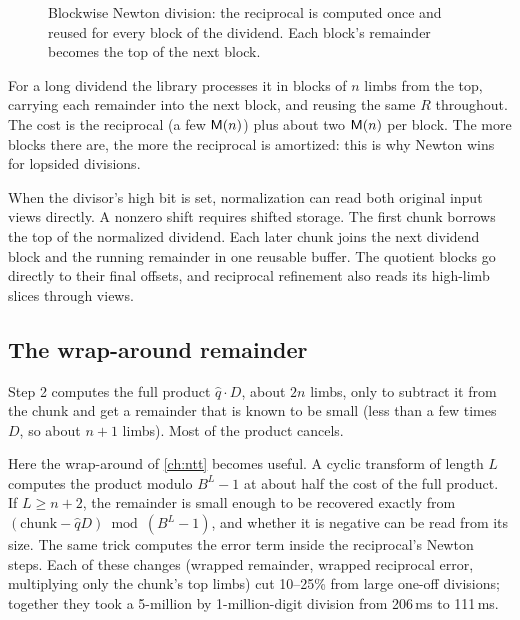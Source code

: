 \begin{figure}[ht]
\centering
{}
\caption{Blockwise Newton division: the reciprocal is computed once and reused for every
block of the dividend. Each block's remainder becomes the top of the next block.}
\end{figure}

For a long dividend the library processes it in blocks of $n$ limbs from the top, carrying
each remainder into the next block, and reusing the same $R$ throughout. The cost is the
reciprocal (a few $\mathsf{M}(n)$) plus about two $\mathsf{M}(n)$ per block. The more blocks there are, the
more the reciprocal is amortized: this is why Newton wins for lopsided divisions.

When the divisor's high bit is set, normalization can read both original input
views directly. A nonzero shift requires shifted storage. The first chunk borrows
the top of the normalized dividend. Each later chunk joins the next dividend
block and the running remainder in one reusable buffer. The quotient blocks go
directly to their final offsets, and reciprocal refinement also reads its
high-limb slices through views.

\subsection{The wrap-around remainder}
\label{sec:wrap}

Step 2 computes the full product $\hat q \cdot D$, about $2n$ limbs, only to subtract it from
the chunk and get a remainder that is known to be small (less than a few times $D$, so about
$n + 1$ limbs). Most of the product cancels.

Here the wrap-around of \cref{ch:ntt} becomes useful. A cyclic transform of length $L$
computes the product modulo $B^L - 1$ at about half the cost of the full product. If
$L \ge n + 2$, the remainder is small enough to be recovered exactly from
$(\text{chunk} - \hat q D) \bmod (B^L - 1)$, and whether it is negative can be read from its
size. The same trick computes the error term inside the reciprocal's Newton steps. Each of
these changes (wrapped remainder, wrapped reciprocal error, multiplying only the chunk's top
limbs) cut 10--25\% from large one-off divisions; together they took a 5-million by
1-million-digit division from 206\,ms to 111\,ms.

